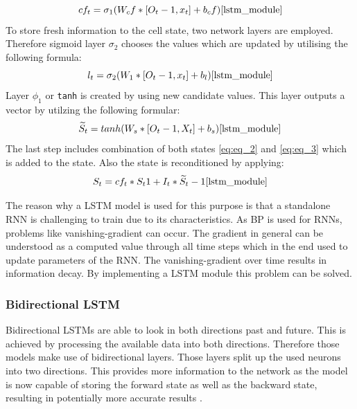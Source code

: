 \begin{equation}
cf_t = \sigma_1 (W_cf * [O_t-1, x_t] + b_cf)
\cite{lstm_module}
\label{eq:eq_1}
\end{equation}
To store fresh information to the cell state, two network layers are employed. Therefore sigmoid layer $\sigma_2$ chooses the values which are updated by utilising the following formula:
\begin{equation}
l_t = \sigma_2(W_1 *[O_t-1, x_t]+ b_l)
\cite{lstm_module}
\label{eq:eq_2}
\end{equation}
Layer $\phi_1$ or \verb|tanh| is created by using new candidate values. This layer outputs a  vector by utilzing the following formular: 
\begin{equation}
\widetilde{S}_t = tanh(W_s * [O_t-1, X_t] + b_s)
\cite{lstm_module}
\label{eq:eq_3}
\end{equation}
The last step includes combination of both states \ref{eq:eq_2} and \ref{eq:eq_3} which is added to the state. Also the state is reconditioned by applying: \cite{lstm_module}
\begin{equation}
S_t = cf_t * S_t1 + I_t * \widetilde{S}_t-1
\cite{lstm_module}
\label{eq:eq_4}
\end{equation}

The reason why a LSTM model is used for this purpose is that a standalone RNN is challenging to train due to its characteristics. As BP is used for RNNs, problems like vanishing-gradient can occur. The gradient in general can be understood as a computed value through all time steps which in the end used to update parameters of the RNN. The vanishing-gradient over time results in information decay. By implementing a LSTM module this problem can be solved. \cite{lstm_overcome_rnn_problem}

\subsubsection{Bidirectional LSTM}
Bidirectional LSTMs are able to look in both directions past and future. This is achieved by processing the available data into both directions. Therefore those models make use of bidirectional layers. Those layers split up the used neurons into two directions. \cite{bi_di_1} This provides more information to the network as the model is now capable of storing the forward state as well as the backward state, resulting in potentially more accurate results \cite{bi_di_2}. 

